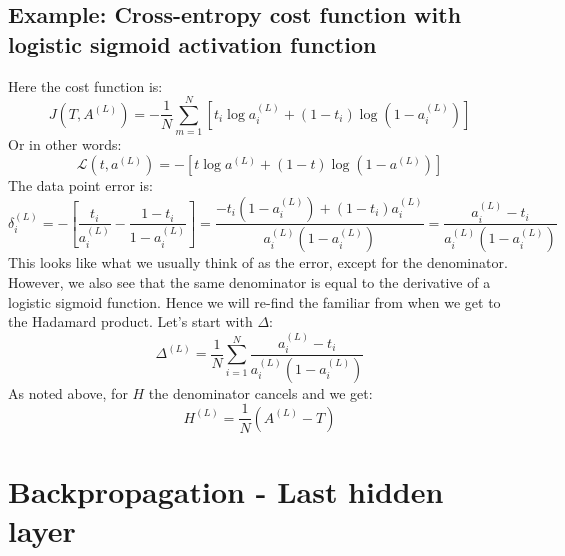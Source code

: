 \documentclass[12pt, a4paper]{article}
\numberwithin{equation}{section}
\begin{document}
\subsection{Example: Cross-entropy cost function with logistic sigmoid activation function}
\label{coursera_case}
Here the cost function is:
\begin{equation}
J(T,A^{(L)})=-\frac{1}{N}\sum_{m=1}^N\left[t_i\log a^{(L)}_i+(1-t_i)\log(1-a^{(L)}_i)\right]
\end{equation}
Or in other words:
\begin{equation}
\mathcal{L}(t,a^{(L)})=-\left[t\log a^{(L)}+(1-t)\log(1-a^{(L)})\right]
\end{equation}
The data point error is:
\begin{equation}
\delta^{(L)}_i=-\left[\frac{t_i}{a^{(L)}_i}-\frac{1-t_i}{1-a^{(L)}_i}\right]=\frac{-t_i(1-a^{(L)}_i)+(1-t_i)a^{(L)}_i}{a^{(L)}_i(1-a^{(L)}_i)}=\frac{a^{(L)}_i-t_i}{a^{(L)}_i(1-a^{(L)}_i)}
\end{equation}
This looks like what we usually think of as the error, except for the denominator. However, we also see that the same denominator is equal to the derivative of a logistic sigmoid function. Hence we will re-find the familiar from when we get to the Hadamard product. Let's start with $\Delta$:
\begin{equation}
\Delta^{(L)}=\frac{1}{N}\sum_{i=1}^N\frac{a^{(L)}_i-t_i}{a^{(L)}_i(1-a^{(L)}_i)}
\end{equation}
As noted above, for $H$ the denominator cancels and we get:
\begin{equation}
H^{(L)}=\frac{1}{N}(A^{(L)}-T)
\end{equation}

\section{Backpropagation - Last hidden layer}
\end{document}
